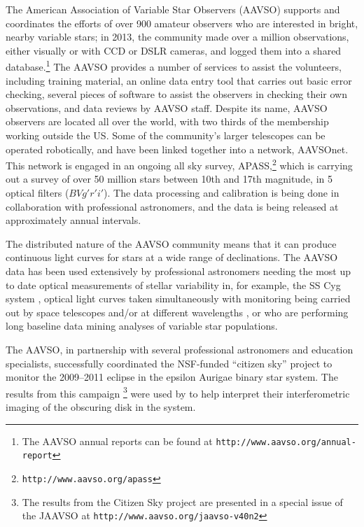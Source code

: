 \documentclass{ar2e}
\def\eg{{\it e.g.}\xspace}
\def\CaseStudy#1{\noindent{\it\bf #1 \,\,\,\,}}
\def\url#1{\texttt{#1}}
\begin{document}

\CaseStudy{Variable Star Monitoring: the AAVSO.}
The American Association of Variable Star Observers (AAVSO) supports and
coordinates the efforts of over 900 amateur observers who are interested in
bright, nearby variable stars; in 2013, the community made over a million
observations, either visually or with CCD or DSLR cameras, and logged them
into a shared database.\footnote{The AAVSO annual reports can be found at
\url{http://www.aavso.org/annual-report}} The AAVSO provides a number of
services to assist the volunteers, including training material, an online data
entry tool that carries out basic error checking, several pieces of
software to assist the observers in checking their own observations, and data
reviews by AAVSO staff. Despite its name, AAVSO observers are located all over
the world, with two thirds of the membership working outside the US. Some of
the community's larger telescopes can be operated robotically, and have been
linked together into a network, AAVSOnet. This network is engaged in an
ongoing all sky survey, APASS,\footnote{\url{http://www.aavso.org/apass}}
which is carrying out a survey of over 50 million stars between 10th and 17th
magnitude, in 5 optical filters ($BVg'r'i'$). The data processing and
calibration is being done in collaboration with professional astronomers, 
and the data is being released at approximately annual intervals.

The distributed nature of the AAVSO community means that it can produce
continuous light curves for stars at a wide range of declinations. The AAVSO
data has been used extensively by professional astronomers needing the most 
up to date optical measurements of stellar variability in, for example, the 
SS Cyg system \citep{Miller-Jones++2013},  optical light curves taken
simultaneously with monitoring being carried out by space telescopes and/or at
different wavelengths \citep[see \eg][for a successful joint AAVSO--HST
program]{Szkody++2013},  or who are performing long baseline data mining
analyses of variable star populations. 

The AAVSO, in partnership with several professional astronomers and education
specialists, successfully coordinated the NSF-funded ``citizen sky'' project
to monitor the 2009--2011 eclipse in the epsilon Aurigae binary star system.
The results from this campaign \citep{Stencel2012}\footnote{The results from
the Citizen Sky project are presented in a special issue of the JAAVSO at 
\url{http://www.aavso.org/jaavso-v40n2}} were used by \citet{Kloppenborg++2010}
to help interpret their interferometric imaging of the obscuring disk in the
system.
\end{document}

